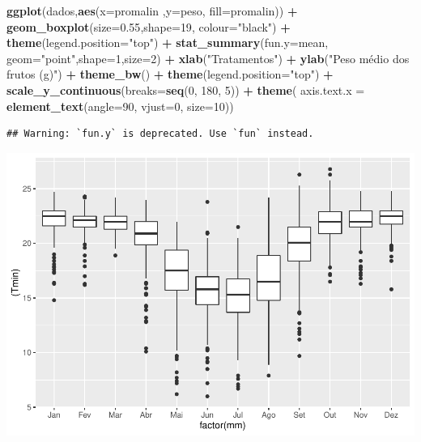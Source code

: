 \documentclass[
]{book}
\newenvironment{Shaded}{\begin{snugshade}}{\end{snugshade}}
\newcommand{\DataTypeTok}[1]{\textcolor[rgb]{0.13,0.29,0.53}{#1}}
\newcommand{\DecValTok}[1]{\textcolor[rgb]{0.00,0.00,0.81}{#1}}
\newcommand{\FloatTok}[1]{\textcolor[rgb]{0.00,0.00,0.81}{#1}}
\newcommand{\KeywordTok}[1]{\textcolor[rgb]{0.13,0.29,0.53}{\textbf{#1}}}
\newcommand{\NormalTok}[1]{#1}
\newcommand{\OperatorTok}[1]{\textcolor[rgb]{0.81,0.36,0.00}{\textbf{#1}}}
\newcommand{\StringTok}[1]{\textcolor[rgb]{0.31,0.60,0.02}{#1}}
\begin{document}
\begin{Shaded}
\begin{Highlighting}[]
\KeywordTok{ggplot}\NormalTok{(dados,}\KeywordTok{aes}\NormalTok{(}\DataTypeTok{x=}\NormalTok{promalin ,}\DataTypeTok{y=}\NormalTok{peso, }\DataTypeTok{fill=}\NormalTok{promalin)) }\OperatorTok{+}\StringTok{ }
\StringTok{      }\KeywordTok{geom_boxplot}\NormalTok{(}\DataTypeTok{size=}\FloatTok{0.55}\NormalTok{,}\DataTypeTok{shape=}\DecValTok{19}\NormalTok{, }\DataTypeTok{colour=}\StringTok{"black"}\NormalTok{) }\OperatorTok{+}\StringTok{ }
\StringTok{      }\KeywordTok{theme}\NormalTok{(}\DataTypeTok{legend.position=}\StringTok{"top"}\NormalTok{) }\OperatorTok{+}\StringTok{ }
\StringTok{      }\KeywordTok{stat_summary}\NormalTok{(}\DataTypeTok{fun.y=}\NormalTok{mean, }\DataTypeTok{geom=}\StringTok{"point"}\NormalTok{,}\DataTypeTok{shape=}\DecValTok{1}\NormalTok{,}\DataTypeTok{size=}\DecValTok{2}\NormalTok{) }\OperatorTok{+}\StringTok{ }
\StringTok{      }\KeywordTok{xlab}\NormalTok{(}\StringTok{"Tratamentos"}\NormalTok{) }\OperatorTok{+}\StringTok{  }
\StringTok{      }\KeywordTok{ylab}\NormalTok{(}\StringTok{"Peso médio dos frutos (g)"}\NormalTok{)  }\OperatorTok{+}
\StringTok{      }\KeywordTok{theme_bw}\NormalTok{() }\OperatorTok{+}
\StringTok{      }\KeywordTok{theme}\NormalTok{(}\DataTypeTok{legend.position=}\StringTok{"top"}\NormalTok{) }\OperatorTok{+}
\StringTok{      }\KeywordTok{scale_y_continuous}\NormalTok{(}\DataTypeTok{breaks=}\KeywordTok{seq}\NormalTok{(}\DecValTok{0}\NormalTok{, }\DecValTok{180}\NormalTok{, }\DecValTok{5}\NormalTok{)) }\OperatorTok{+}
\StringTok{      }\KeywordTok{theme}\NormalTok{( }\DataTypeTok{axis.text.x  =} \KeywordTok{element_text}\NormalTok{(}\DataTypeTok{angle=}\DecValTok{90}\NormalTok{, }\DataTypeTok{vjust=}\DecValTok{0}\NormalTok{, }\DataTypeTok{size=}\DecValTok{10}\NormalTok{))}
\end{Highlighting}
\end{Shaded}

\begin{verbatim}
## Warning: `fun.y` is deprecated. Use `fun` instead.
\end{verbatim}

\includegraphics{TudodoR_files/figure-latex/unnamed-chunk-241-1.pdf}
\end{document}
